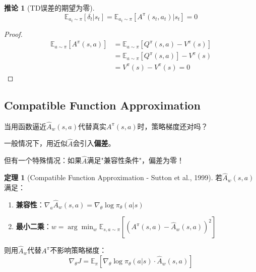 \documentclass[11pt,a4paper]{article}
\theoremstyle{definition}
\newtheorem{theorem}{定理}[section]
\newtheorem{corollary}{推论}[section]
\begin{document}
\begin{corollary}[TD误差的期望为零]
\[
\mathbb{E}_{a_t \sim \pi}[\delta_t | s_t] = \mathbb{E}_{a_t \sim \pi}[A^\pi(s_t, a_t) | s_t] = 0
\]
\end{corollary}

\begin{proof}
\begin{align*}
\mathbb{E}_{a \sim \pi}[A^\pi(s, a)] &= \mathbb{E}_{a \sim \pi}[Q^\pi(s, a) - V^\pi(s)] \\
&= \mathbb{E}_{a \sim \pi}[Q^\pi(s, a)] - V^\pi(s) \\
&= V^\pi(s) - V^\pi(s) = 0
\end{align*}
\end{proof}

\subsection{Compatible Function Approximation}

\begin{plainwords}[问题]
当用函数逼近$\hat{A}_w(s,a)$代替真实$A^\pi(s,a)$时，策略梯度还对吗？

一般情况下，用近似$\hat{A}$会引入\textbf{偏差}。

但有一个特殊情况：如果$\hat{A}$满足"兼容性条件"，偏差为零！
\end{plainwords}

\begin{theorem}[Compatible Function Approximation - Sutton et al., 1999]
若$\hat{A}_w(s,a)$满足：
\begin{enumerate}
    \item \textbf{兼容性}：$\nabla_a \hat{A}_w(s,a) = \nabla_\theta \log \pi_\theta(a|s)$
    \item \textbf{最小二乘}：$w = \arg\min_w \mathbb{E}_{s,a \sim \pi}[(A^\pi(s,a) - \hat{A}_w(s,a))^2]$
\end{enumerate}
则用$\hat{A}_w$代替$A^\pi$不影响策略梯度：
\[
\nabla_\theta J = \mathbb{E}_{\pi}[\nabla_\theta \log \pi_\theta(a|s) \cdot \hat{A}_w(s,a)]
\]
\end{theorem}
\end{document}

